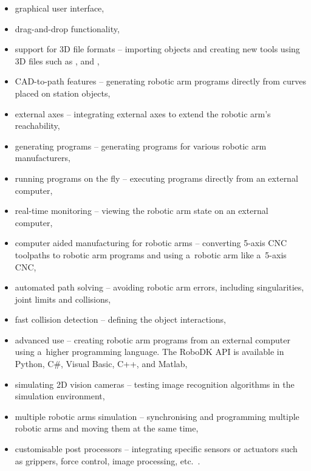 \begin{itemize}
\item graphical user interface,
\item drag-and-drop functionality, 
\item support for 3D file formats -- importing objects and creating new tools using 3D files such as ,  and ,
\item CAD-to-path features -- generating robotic arm programs directly from curves placed on station objects,
\item external axes -- integrating external axes to extend the robotic arm’s reachability,
\item generating programs -- generating programs for various robotic arm manufacturers,
\item running programs on the fly -- executing programs directly from an external computer,
\item real-time monitoring -- viewing the robotic arm state on an external computer,
\item computer aided manufacturing for robotic arms -- converting 5-axis CNC toolpaths to robotic arm programs and using a~robotic arm like a~5-axis CNC,
\item automated path solving -- avoiding robotic arm errors, including singularities, joint limits and collisions,
\item fast collision detection -- defining the object interactions, 
\item advanced use -- creating robotic arm programs from an external computer using a~higher programming language. The RoboDK API is available in Python, C\#, Visual Basic, C++, and Matlab,
\item simulating 2D vision cameras -- testing image recognition algorithms in the simulation environment,
\item multiple robotic arms simulation -- synchronising and programming multiple robotic arms and moving them at the same time, 
\item customisable post processors -- integrating specific sensors or actuators such as grippers, force control, image processing, etc.~\cite{robodkfeatures}.
\end{itemize}

\begin{comment}

\subsection{RoboDK licence and versions}

RoboDK offers free (limited), educational or professional versions. 
The software is available for Windows, MacOS, Ubuntu Linux, Android or iOS. It supports either 32-bit or 64-bit versions of the above-mentioned operating systems. At the time of writing this document, the latest version of RoboDK is 5.2~\cite{robodkversions}. 

\end{comment}

